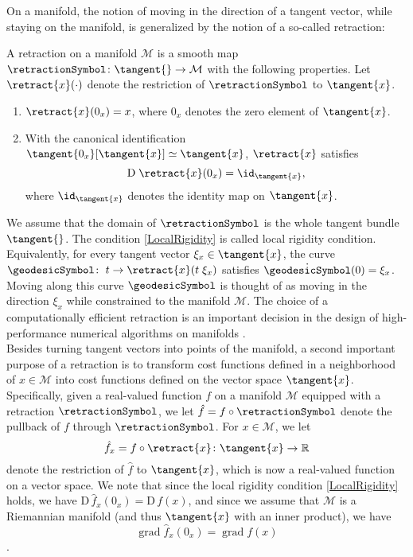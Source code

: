 On a manifold, the notion of moving in the direction of a tangent vector, while staying on the manifold, is generalized by the notion of a so-called retraction:
\begin{definition}\label{Retraction}
    A retraction on a manifold $\mathcal{M}$ is a smooth map $\retractionSymbol \colon \tangent{} \to \mathcal{M}$ with the following properties. Let $\retract{x}(\cdot)$ denote the restriction of $\retractionSymbol$ to $\tangent{x}$. 
    \begin{enumerate}
        \item $\retract{x}(0_x) = x$, where $0_x$ denotes the zero element of $\tangent{x}$. 
        \item With the canonical identification $\tangent{0_x}[\tangent{x}] \simeq \tangent{x}$, $\retract{x}$ satisfies \begin{equation} \mathrm{D} \; \retract{x}(0_x) = \id_{\tangent{x}}, \label{LocalRigidity} \end{equation} where $\id_{\tangent{x}}$ denotes the identity map on $\tangent{x}$.  
    \end{enumerate}
\end{definition}
We assume that the domain of $\retractionSymbol$ is the whole tangent bundle $\tangent{}$. The condition \cref{LocalRigidity} is called local rigidity condition. Equivalently, for every tangent vector $\xi_x \in \tangent{x}$, the curve $\geodesicSymbol \colon \; t \to \retract{x}(t \; \xi_x)$ satisfies $\dot{\geodesicSymbol}(0) = \xi_x$. Moving along this curve $\geodesicSymbol$ is thought of as moving in the direction $\xi_x$ while constrained to the manifold $\mathcal{M}$. The choice of a computationally efficient retraction is an important decision in the design of high-performance numerical algorithms on manifolds \cite[p.~54]{AbsilMahonySepulchre:2008}. \\
Besides turning tangent vectors into points of the manifold, a second important purpose of a retraction is to transform cost functions defined in a neighborhood of $x \in \mathcal{M}$ into cost functions defined on the vector space $\tangent{x}$. Specifically, given a real-valued function $f$ on a manifold $\mathcal{M}$ equipped with a retraction $\retractionSymbol$, we let $\hat{f} = f \circ \retractionSymbol$ denote the pullback of $f$ through $\retractionSymbol$. For $x \in \mathcal{M}$, we let
\begin{equation}\label{pullback}
    \hat{f}_x = f \circ \retract{x} \colon \tangent{x} \to \mathbb{R}
\end{equation}
denote the restriction of $\hat{f}$ to $\tangent{x}$, which is now a real-valued function on a vector space. We note that since the local rigidity condition \cref{LocalRigidity} holds, we have $\mathrm{D} \, \hat{f}_x (0_x) = \mathrm{D} \, f(x)$, and since we assume that $\mathcal{M}$ is a Riemannian manifold (and thus $\tangent{x}$ with an inner product), we have 
\begin{equation*}
    \operatorname{grad} \hat{f}_x (0_x) = \operatorname{grad} f(x)
\end{equation*}
\cite[p.~54-56]{AbsilMahonySepulchre:2008}.
